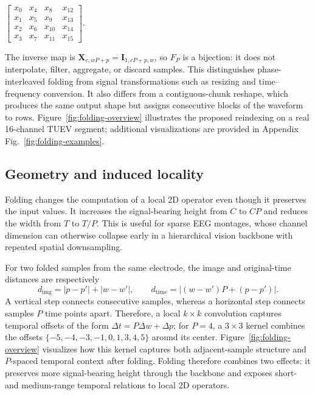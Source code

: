 \begin{center}
\small
$\begin{bmatrix}
x_0&x_4&x_8&x_{12}\\
x_1&x_5&x_9&x_{13}\\
x_2&x_6&x_{10}&x_{14}\\
x_3&x_7&x_{11}&x_{15}
\end{bmatrix}$.
\end{center}

The inverse map is
$\mathbf{X}_{c,wP+p}=\mathbf{I}_{1,cP+p,w}$, so $F_P$ is a bijection: it does
not interpolate, filter, aggregate, or discard samples. This distinguishes
phase-interleaved folding from signal transformations such as resizing and
time--frequency conversion. It also differs from a contiguous-chunk reshape,
which produces the same output shape but assigns consecutive blocks of the
waveform to rows. Figure~\ref{fig:folding-overview} illustrates the proposed
reindexing on a real 16-channel TUEV segment; additional visualizations are
provided in Appendix Fig.~\ref{fig:folding-examples}.

\subsection{Geometry and induced locality}

Folding changes the computation of a local 2D operator even though it preserves
the input values. It increases the signal-bearing height from $C$ to $CP$ and
reduces the width from $T$ to $T/P$. This is useful for sparse EEG montages,
whose channel dimension can otherwise collapse early in a hierarchical vision
backbone with repeated spatial downsampling.

For two folded samples from the same electrode, the image and original-time
distances are respectively
\begin{equation}
d_{\mathrm{img}}=|p-p'|+|w-w'|,\qquad
d_{\mathrm{time}}=|(w-w')P+(p-p')|.
\end{equation}
A vertical step connects consecutive samples, whereas a horizontal step connects
samples $P$ time points apart. Therefore, a local $k\times k$ convolution
captures temporal offsets of the form $\Delta t=P\Delta w+\Delta p$; for
$P=4$, a $3\times3$ kernel combines the offsets
$\{-5,-4,-3,-1,0,1,3,4,5\}$ around its center. Figure~\ref{fig:folding-overview}
visualizes how this kernel captures both adjacent-sample structure and
$P$-spaced temporal context after folding. Folding therefore combines two
effects: it preserves more signal-bearing height through the backbone and
exposes short- and medium-range temporal relations to local 2D operators.

